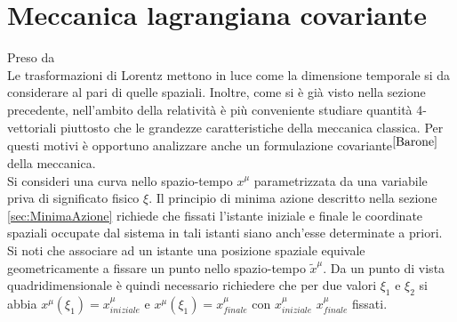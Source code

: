 \section{Meccanica lagrangiana covariante}Preso da \cite{Barone}\\
Le trasformazioni di Lorentz mettono in luce come la dimensione temporale si da considerare al pari di quelle spaziali. Inoltre, come si è già visto nella sezione precedente, nell'ambito della relatività è più conveniente studiare quantità 4-vettoriali piuttosto che le grandezze caratteristiche della meccanica classica. Per questi motivi è opportuno analizzare anche un formulazione covariante$^{\cite{Barone}}$ della meccanica.\\

Si consideri una curva nello spazio-tempo $x^\mu$ parametrizzata da una variabile priva di significato fisico $\xi$. Il principio di minima azione descritto nella sezione \ref{sec:MinimaAzione} richiede che fissati l'istante iniziale e finale le coordinate spaziali occupate dal sistema in tali istanti siano anch'esse determinate a priori. Si noti che associare ad un istante una posizione spaziale equivale geometricamente a fissare un punto nello spazio-tempo $\tilde{x}^\mu$. Da un punto di vista quadridimensionale è quindi necessario richiedere che per due valori $\xi_1$ e $\xi_2$ si abbia $x^\mu(\xi_1)=x^\mu_{iniziale}$ e $x^\mu(\xi_1)=x^\mu_{finale}$ con $x^\mu_{iniziale}$ $x^\mu_{finale}$ fissati.\\


